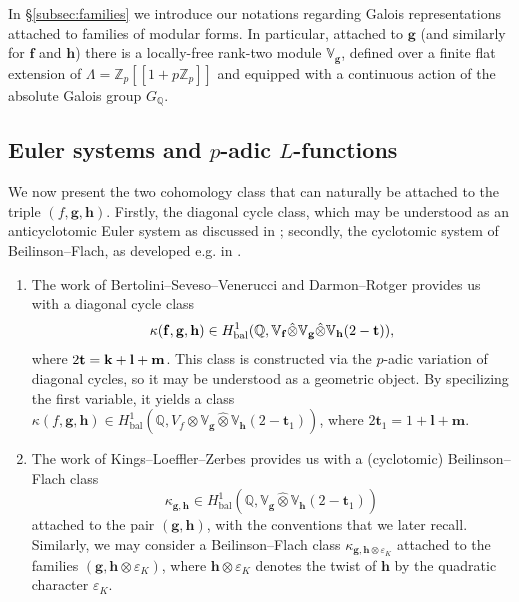 \documentclass[a4paper,11pt]{amsart}
\theoremstyle{plain}
\theoremstyle{definition}
\theoremstyle{remark}
\newcommand{\bb}{\mathbb}
\newcommand{\frk}{\mathfrak}
\DeclareMathOperator{\lcm}{lcm}
\DeclareMathOperator{\bal}{bal}
\newcommand{\hf}{{\mathbf{f}}}
\newcommand{\hg}{{\mathbf{g}}}
\newcommand{\hh}{{\mathbf h}}
\numberwithin{equation}{section}
\begin{document}

In \S\ref{subsec:families} we introduce our notations regarding Galois representations attached to families of modular forms. In particular, attached to $\hg$ (and similarly for $\hf$ and $\hh$) there is a locally-free rank-two module $\mathbb V_{\hg}$, defined over a finite flat extension of $\Lambda = \mathbb Z_p[[1+p\mathbb Z_p]]$ and equipped with a continuous action of the absolute Galois group $G_{\mathbb Q}$.

\subsection{Euler systems and $p$-adic $L$-functions}

We now present the two cohomology class that can naturally be attached to the triple $(f,\hg,\hh)$. Firstly, the diagonal cycle class, which may be understood as an anticyclotomic Euler system as discussed in \cite{ACR}; secondly, the cyclotomic system of Beilinson--Flach, as developed e.g. in \cite{KLZ}.

\begin{enumerate}
    \item[(A)] The work of Bertolini--Seveso--Venerucci \cite{BSV} and Darmon--Rotger \cite{DR3} provides us with a diagonal cycle class \[ \kappa(\hf,\hg,\hh) \in H^1_{\bal}(\mathbb Q,  \bb{V}_{\hf} \hat\otimes \mathbb V_{\hg} \hat \otimes \mathbb V_{\hh}(2-{\bf t})), \] where $2{\bf t} = {\bf k} + {\bf l} + {\bf m}$. This class is constructed via the $p$-adic variation of diagonal cycles, so it may be understood as a geometric object. By specilizing the first variable, it yields a class $\kappa(f,\hg,\hh)\in H^1_{\bal}(\bb{Q},V_f\otimes\bb{V}_{\hg}\hat{\otimes}\bb{V}_{\hh}(2-\mathbf{t}_1))$, where $2\mathbf{t}_1=1+\mathbf{l}+\mathbf{m}$.

    \item[(B)] The work of Kings--Loeffler--Zerbes \cite{KLZ} provides us with a (cyclotomic) Beilinson--Flach class
    \[
    \kappa_{\hg,\hh}\in H^1_{\bal}(\mathbb Q, \mathbb V_{\hg} \hat \otimes \mathbb V_{\hh} (2-\mathbf{t}_1))
    \]
    attached to the pair $(\hg,\hh)$, with the conventions that we later recall. Similarly, we may consider a Beilinson--Flach class $\kappa_{\hg,\hh\otimes\varepsilon_K}$ attached to the families $(\hg, \hh \otimes \varepsilon_K)$, where $\hh\otimes \varepsilon_K$ denotes the twist of $\hh$ by the quadratic character $\varepsilon_K$.
\end{enumerate}
\end{document}
